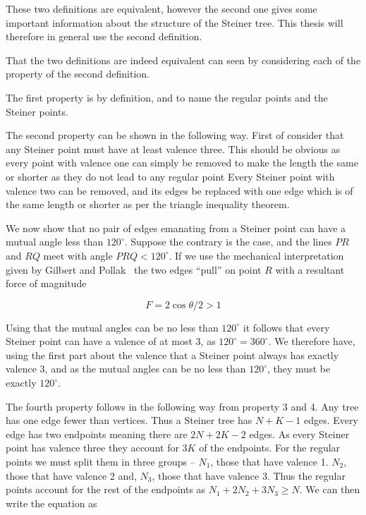 These two definitions are equivalent, however the second one gives some
important information about the structure of the Steiner tree. This thesis will
therefore in general use the second definition.

That the two definitions are indeed equivalent can seen by considering each of
the property of the second definition.

The first property is by definition, and to name the regular points and the
Steiner points.

The second property can be shown in the following way. First of consider that
any Steiner point must have at least valence three. This should be obvious as every
point with valence one can simply be removed to make the length the same or
shorter as they do not lead to any regular point Every Steiner point with
valence two can be removed, and its edges be replaced with one edge which is of
the same length or shorter as per the triangle inequality theorem.

We now show that no pair of edges emanating from a Steiner point can have a
mutual angle less than $120^{\circ}$. Suppose the contrary is the case, and the
lines $PR$ and $RQ$ meet with angle $PRQ < 120^{\circ}$. If we use the
mechanical interpretation given by Gilbert and Pollak~\cite{Gilbert1968} the two
edges ``pull'' on point $R$ with a resultant force of magnitude

\begin{equation}
F = 2 \cos \theta / 2 > 1
\end{equation}


Using that the mutual angles can be no less than $120^{\circ}$ it follows that
every Steiner point can have a valence of at most 3, as $120^{\circ} =
360^{\circ}$. We therefore have, using the first part about the valence that a
Steiner point always has exactly valence 3, and as the mutual angles can be no
less than $120^{\circ}$, they must be exactly $120^{\circ}$.


The fourth property follows in the following way from property 3 and 4. Any tree
has one edge fewer than vertices. Thus a Steiner tree has $N+K-1$ edges. Every
edge has two endpoints meaning there are $2N+2K-2$ edges. As every Steiner point
has valence three they account for $3K$ of the endpoints. For the regular points
we must split them in three groups -- $N_1$, those that have valence 1. $N_2$,
those that have valence 2 and, $N_3$, those that have valence 3. Thus the
regular points account for the rest of the endpoints as
$N_1 + 2 N_2 + 3 N_3 \ge N$. We can then write the equation as

